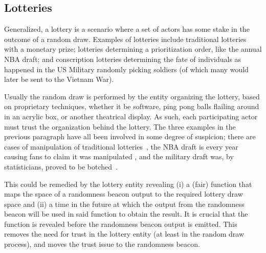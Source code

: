 \subsection{Lotteries}\label{subsec:usecase_lotteries}
Generalized, a lottery is a scenario where a set of actors has some stake in the outcome of a random draw. Examples of lotteries include traditional lotteries with a monetary prize; lotteries determining a prioritization order, like the annual NBA draft; and conscription lotteries determining the fate of individuals as happened in the US Military randomly picking soldiers (of which many would later be sent to the Vietnam War).

Usually the random draw is performed by the entity organizing the lottery, based on proprietary techniques, whether it be software, ping pong balls flailing around in an acrylic box, or another theatrical display. As such, each participating actor must trust the organization behind the lottery. The three examples in the previous paragraph have all been involved in some degree of suspicion; there are cases of manipulation of traditional lotteries~\cite{lotteryscandal-eddietipton, lotteryscandal-666}, the NBA draft is every year causing fans to claim it was manipulated , and the military draft was, by statisticians, proved to be botched~\cite{starr1997nonrandom}.

This could be remedied by the lottery entity revealing (i) a (fair) function that maps the space of a randomness beacon output to the required lottery draw space and (ii) a time in the future at which the output from the randomness beacon will be used in said function to obtain the result. It is crucial that the function is revealed before the randomness beacon output is emitted. This removes the need for trust in the lottery entity (at least in the random draw process), and moves the trust issue to the randomness beacon.
